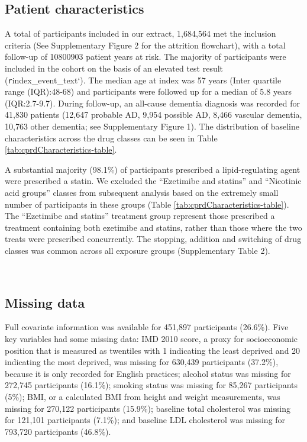 \documentclass[
]{article}
\begin{document}
\hypertarget{patient-characteristics}{%
\subsection{Patient characteristics}\label{patient-characteristics}}

A total of participants included in our extract, 1,684,564 met the inclusion criteria (See Supplementary Figure 2 for the attrition flowchart), with a total follow-up of 10800903 patient years at risk. The majority of participants were included in the cohort on the basis of an elevated test result (\texttt{r}index\_event\_text`). The median age at index was 57 years (Inter quartile range (IQR):48-68) and participants were followed up for a median of 5.8 years (IQR:2.7-9.7). During follow-up, an all-cause dementia diagnosis was recorded for 41,830 patients (12,647 probable AD, 9,954 possible AD, 8,466 vascular dementia, 10,763 other dementia; see Supplementary Figure 1). The distribution of baseline characteristics across the drug classes can be seen in Table \ref{tab:cprdCharacteristics-table}.

A substantial majority (98.1\%) of participants prescribed a lipid-regulating agent were prescribed a statin. We excluded the ``Ezetimibe and statins'' and ``Nicotinic acid groups'' classes from subsequent analysis based on the extremely small number of participants in these groups (Table \ref{tab:cprdCharacteristics-table}). The ``Ezetimibe and statins'' treatment group represent those prescribed a treatment containing both ezetimibe and statins, rather than those where the two treats were prescribed concurrently. The stopping, addition and switching of drug classes was common across all exposure groups (Supplementary Table 2).

~

\hypertarget{missing-data}{%
\subsection{Missing data}\label{missing-data}}

Full covariate information was available for 451,897 participants (26.6\%). Five key variables had some missing data: IMD 2010 score, a proxy for socioeconomic position that is measured as twentiles with 1 indicating the least deprived and 20 indicating the most deprived, was missing for 630,439 participants (37.2\%), because it is only recorded for English practices; alcohol status was missing for 272,745 participants (16.1\%); smoking status was missing for 85,267 participants (5\%); BMI, or a calculated BMI from height and weight measurements, was missing for 270,122 participants (15.9\%); baseline total cholesterol was missing for 121,101 participants (7.1\%); and baseline LDL cholesterol was missing for 793,720 participants (46.8\%).
\end{document}
